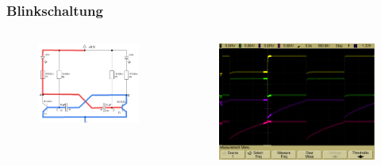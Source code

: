 \begin{frame}
    \frametitle{Blinkschaltung}
    \begin{columns}[c]
        \begin{figure}[H]
        \begin{center}
                \includegraphics[scale=0.25]{./img/schaltungen/blink_3.png}
        \end{center}
        \end{figure}
    \begin{figure}[H]
    \begin{center}
            \includegraphics[scale=0.12]{./img/oszi/blink_shade_1_5.png}

\end{center}
\end{figure}
\end{columns}
\end{frame}
